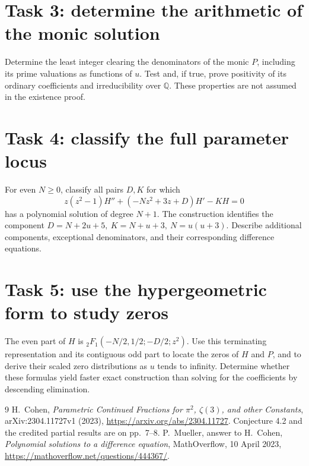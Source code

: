 \documentclass[11pt]{article}
\begin{document}
\section*{Task 3: determine the arithmetic of the monic solution}
Determine the least integer clearing the denominators of the monic
\(P\), including its prime valuations as functions of \(u\).
Test and, if true, prove positivity of its ordinary coefficients and
irreducibility over \(\mathbb Q\). These properties are not assumed
in the existence proof.

\section*{Task 4: classify the full parameter locus}
For even \(N\ge0\), classify all pairs \(D,K\) for which
\[
 z(z^2-1)H''+(-Nz^2+3z+D)H'-KH=0
\]
has a polynomial solution of degree \(N+1\).
The construction identifies the component
\(D=N+2u+5,\ K=N+u+3,\ N=u(u+3)\).
Describe additional components, exceptional denominators, and their
corresponding difference equations.

\section*{Task 5: use the hypergeometric form to study zeros}
The even part of \(H\) is
\({}_2F_1(-N/2,1/2;-D/2;z^2)\).
Use this terminating representation and its contiguous odd part
to locate the zeros of \(H\) and \(P\), and to derive their scaled
zero distributions as \(u\) tends to infinity.
Determine whether these formulas yield faster exact construction
than solving for the coefficients by descending elimination.

\begin{thebibliography}{9}
\small
{}
H.~Cohen, \emph{Parametric Continued Fractions for \(\pi^2\),
\(\zeta(3)\), and other Constants}, arXiv:2304.11727v1 (2023),
\url{https://arxiv.org/abs/2304.11727}.
Conjecture 4.2 and the credited partial results are on pp.~7--8.
P.~Mueller, answer to H.~Cohen,
\emph{Polynomial solutions to a difference equation},
MathOverflow, 10 April 2023,
\url{https://mathoverflow.net/questions/444367/}.
\end{thebibliography}
\end{document}
